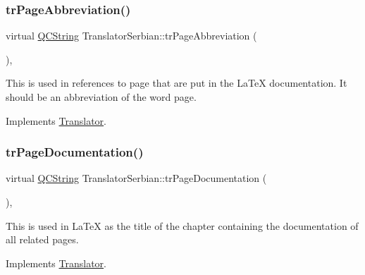 \mbox{\label{class_translator_serbian_a75bdd1c8caecedde8d17b1874f776393}} 
\subsubsection{\texorpdfstring{trPageAbbreviation()}{trPageAbbreviation()}}
{\footnotesize\ttfamily virtual \mbox{\hyperlink{class_q_c_string}{Q\+C\+String}} Translator\+Serbian\+::tr\+Page\+Abbreviation (\begin{DoxyParamCaption}{ }\end{DoxyParamCaption})\hspace{0.3cm}{\ttfamily [inline]}, {\ttfamily [virtual]}}

This is used in references to page that are put in the La\+TeX documentation. It should be an abbreviation of the word page. 

Implements \mbox{\hyperlink{class_translator}{Translator}}.

\mbox{\label{class_translator_serbian_a9557c10058b784c24feb7b78b3807025}} 
\subsubsection{\texorpdfstring{trPageDocumentation()}{trPageDocumentation()}}
{\footnotesize\ttfamily virtual \mbox{\hyperlink{class_q_c_string}{Q\+C\+String}} Translator\+Serbian\+::tr\+Page\+Documentation (\begin{DoxyParamCaption}{ }\end{DoxyParamCaption})\hspace{0.3cm}{\ttfamily [inline]}, {\ttfamily [virtual]}}

This is used in La\+TeX as the title of the chapter containing the documentation of all related pages. 

Implements \mbox{\hyperlink{class_translator}{Translator}}.

\mbox{\label{class_translator_serbian_a0ec9c6fe3eafb08757597964c94404c8}} 
